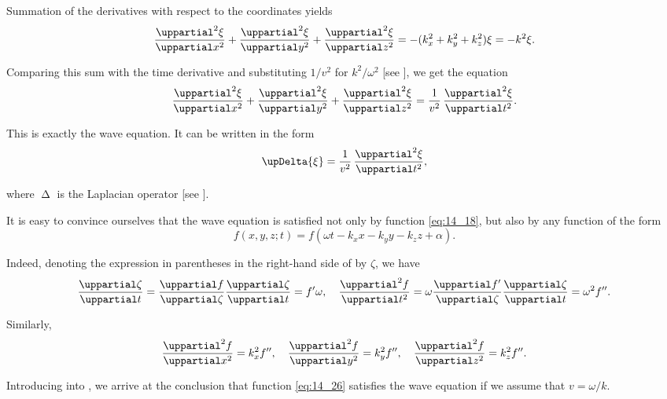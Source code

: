 \noindent
Summation of the derivatives with respect to the coordinates yields
\begin{equation}\label{eq:14_23}
    \diffnpartial{\xi}{x}{2} + \diffnpartial{\xi}{y}{2} + \diffnpartial{\xi}{z}{2} = - (k_x^2 + k_y^2 + k_z^2) \xi = -k^2 \xi.
\end{equation}

\noindent
Comparing this sum with the time derivative and substituting $1/v^2$ for $k^2/\omega^2$ [see ], we get the equation
\begin{equation}\label{eq:14_24}
    \diffnpartial{\xi}{x}{2} + \diffnpartial{\xi}{y}{2} + \diffnpartial{\xi}{z}{2} = \frac{1}{v^2}\, \diffnpartial{\xi}{t}{2}.
\end{equation}

\noindent
This is exactly the wave equation.
It can be written in the form
\begin{equation}\label{eq:14:25}
    \upDelta{\xi} = \frac{1}{v^2}\, \diffnpartial{\xi}{t}{2},
\end{equation}

\noindent
where $\upDelta$ is the Laplacian operator [see ].

It is easy to convince ourselves that the wave equation is satisfied not only by function \eqref{eq:14_18}, but also by any function of the form
\begin{equation}\label{eq:14_26}
    f(x,y,z;t) = f(\omega t - k_x x - k_y y - k_z z + \alpha).
\end{equation}

\noindent
Indeed, denoting the expression in parentheses in the right-hand side of  by $\zeta$, we have
\begin{equation}\label{eq:14_27}
    \diffpartial{\zeta}{t} = \diffpartial{f}{\zeta} \diffpartial{\zeta}{t} = f' \omega,\quad \diffnpartial{f}{t}{2} = \omega \diffpartial{f'}{\zeta} \diffpartial{\zeta}{t} = \omega^2 f''.
\end{equation}

\noindent
Similarly,
\begin{equation}\label{eq:14_28}
    \diffnpartial{f}{x}{2} = k_x^2 f'',\quad \diffnpartial{f}{y}{2} = k_y^2 f'',\quad \diffnpartial{f}{z}{2} = k_z^2 f''.
\end{equation}

\noindent
Introducing  into , we arrive at the conclusion that function \eqref{eq:14_26} satisfies the wave equation if we assume that $v = \omega/k$.

